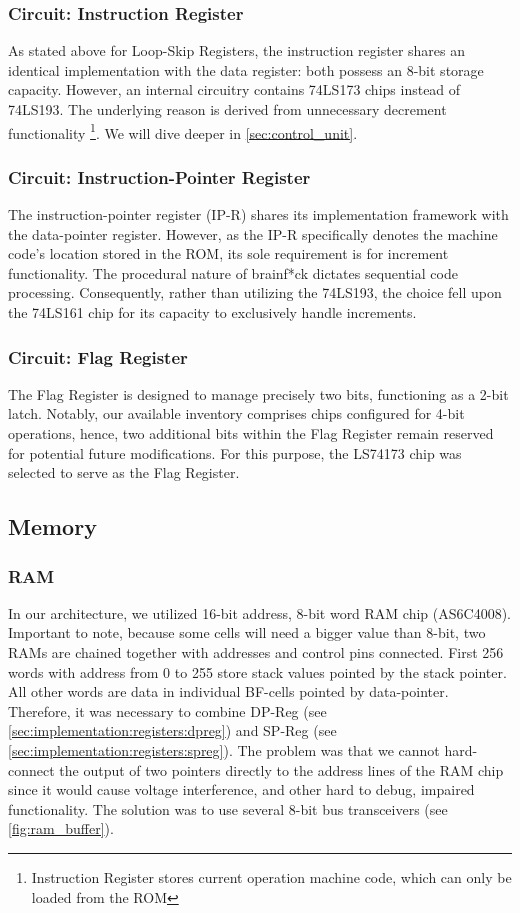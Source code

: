 \subsubsection{Circuit: Instruction Register} \label{sec:implementation:registers:instruction}
As stated above for Loop-Skip Registers, the instruction register shares an identical implementation with the data register: both possess an 8-bit storage capacity. However, an internal circuitry contains 74LS173 chips instead of 74LS193. The underlying reason is derived from unnecessary decrement functionality \footnote{Instruction Register stores current operation machine code, which can only be loaded from the ROM}. We will dive deeper in \ref{sec:control_unit}.

\subsubsection{Circuit: Instruction-Pointer Register}
The instruction-pointer register (IP-R) shares its implementation framework with the data-pointer register. However, as the IP-R specifically denotes the machine code's location stored in the ROM, its sole requirement is for increment functionality. The procedural nature of brainf*ck dictates sequential code processing. Consequently, rather than utilizing the 74LS193, the choice fell upon the 74LS161 chip for its capacity to exclusively handle increments.

\subsubsection{Circuit: Flag Register}
The Flag Register is designed to manage precisely two bits, functioning as a 2-bit latch. Notably, our available inventory comprises chips configured for 4-bit operations, hence, two additional bits within the Flag Register remain reserved for potential future modifications. For this purpose, the LS74173 chip was selected to serve as the Flag Register. 


\subsection{Memory} \label{sec:implementation:memory}
\subsubsection{RAM} \label{sec:implementation:memory:ram}
In our architecture, we utilized 16-bit address, 8-bit word RAM chip (AS6C4008). Important to note, because some cells will need a bigger value than 8-bit, two RAMs are chained together with addresses and control pins connected. First 256 words with address from 0 to 255 store stack values pointed by the stack pointer. All other words are data in individual BF-cells pointed by data-pointer. Therefore, it was necessary to combine DP-Reg (see \ref{sec:implementation:registers:dpreg}) and SP-Reg (see \ref{sec:implementation:registers:spreg}). The problem was that we cannot hard-connect the output of two pointers directly to the address lines of the RAM chip since it would cause voltage interference, and other hard to debug, impaired functionality. The solution was to use several 8-bit bus transceivers (see \ref{fig:ram_buffer}).

